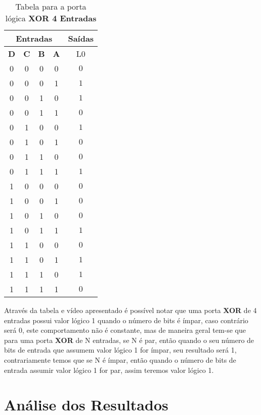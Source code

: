 \documentclass[12pt]{article}
\begin{document}
\begin{table}[H]
    \centering
    \caption{Tabela para a porta lógica \textbf{XOR 4 Entradas}}
    \begin{tabular}{|c|c|c|c|c|}
    \hline
        \multicolumn{4}{|c|}{Entradas} & \multicolumn{1}{|c|}{Saídas}\\
    \hline
    \textbf{D} & \textbf{C} & \textbf{B} & \textbf{A} & L0\\
    \hline
    0 & 0 & 0 & 0 & \(0\) \\
    \hline
    0 & 0 & 0 & 1 & \(1\) \\
    \hline
    0 & 0 & 1 & 0 & \(1\) \\
    \hline
    0 & 0 & 1 & 1 & \(0\) \\
    \hline
    0 & 1 & 0 & 0 & \(1\) \\
    \hline
    0 & 1 & 0 & 1 & \(0\) \\
    \hline
    0 & 1 & 1 & 0 & \(0\) \\
    \hline
    0 & 1 & 1 & 1 & \(1\) \\
    \hline
    1 & 0 & 0 & 0 & \(0\) \\
    \hline
    1 & 0 & 0 & 1 & \(0\) \\
    \hline
    1 & 0 & 1 & 0 & \(0\) \\
    \hline
    1 & 0 & 1 & 1 & \(1\) \\
    \hline
    1 & 1 & 0 & 0 & \(0\) \\
    \hline
    1 & 1 & 0 & 1 & \(1\) \\
    \hline
    1 & 1 & 1 & 0 & \(1\) \\
    \hline
    1 & 1 & 1 & 1 & \(0\) \\
    \hline
    \end{tabular}
    \label{tab:tabela_and}
\end{table}

Através da tabela e vídeo apresentado é possível notar que uma porta \textbf{XOR} de 4 entradas possui valor lógico 1 quando o número de bits é ímpar, caso contrário será 0, este comportamento não é constante, mas de maneira geral tem-se que para uma porta \textbf{XOR} de N entradas, se N é par, então quando o seu número de bits de entrada que assumem valor lógico 1 for ímpar, seu resultado será 1, contrariamente temos que se N é ímpar, então quando o número de bits de entrada assumir valor lógico 1 for par, assim teremos valor lógico 1.

\section{Análise dos Resultados}
\label{sec:Resultados}
\end{document}
